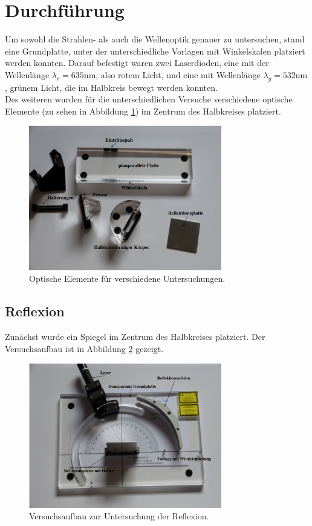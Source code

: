 \section{Durchführung}
\label{sec:Durchführung}
Um sowohl die Strahlen- als auch die Wellenoptik genauer zu untersuchen,
stand eine Grundplatte, unter der unterschiedliche Vorlagen mit Winkelskalen
platziert werden konnten. Darauf befestigt waren zwei Laserdioden, eine mit der 
Wellenlänge $\lambda_r = 635 \si{\nano\m}$, also rotem Licht, und eine mit
Wellenlänge $\lambda_g = 532 \si{\nano\m}$, grünem Licht, die im 
Halbkreis bewegt werden konnten.\\
Des weiteren wurden für die unterschiedlichen Versuche verschiedene optische
Elemente (zu sehen in Abbildung \ref{fig:elemente}) im Zentrum des Halbkreises platziert.

\begin{figure}
    \centering
    \includegraphics[width=0.75\textwidth]{werkzeug.png}
    \caption{Optische Elemente für verschiedene Untersuchungen.}
    \label{fig:elemente}
\end{figure}

\subsection{Reflexion}
Zunächst wurde ein Spiegel im Zentrum des Halbkreises platziert. Der Versuchsaufbau
ist in Abbildung \ref{fig:aufbau} gezeigt.

\begin{figure}
    \centering
    \includegraphics[width=0.75\textwidth]{aufbauuu.png}
    \caption{Versuchsaufbau zur Untersuchung der Reflexion.}
    \label{fig:aufbau}
\end{figure}

